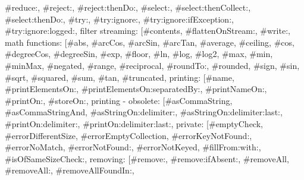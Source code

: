 {\textquotedbl{}\#reduce:\textquotedbl{}, \textquotedbl{}\#reject:\textquotedbl{}, \textquotedbl{}\#reject:thenDo:\textquotedbl{}, \textquotedbl{}\#select:\textquotedbl{}, \textquotedbl{}\#select:thenCollect:\textquotedbl{}, \textquotedbl{}\#select:thenDo:\textquotedbl{}, \textquotedbl{}\#try:\textquotedbl{}, \textquotedbl{}\#try:ignore:\textquotedbl{}, \textquotedbl{}\#try:ignore:ifException:\textquotedbl{}, \textquotedbl{}\#try:ignore:logged:\textquotedbl{}{]}, \textquotedbl{}filter streaming\textquotedbl{}: {[}\textquotedbl{}\#contents\textquotedbl{}, \textquotedbl{}\#flattenOnStream:\textquotedbl{}, \textquotedbl{}\#write:\textquotedbl{}{]}, \textquotedbl{}math functions\textquotedbl{}: {[}\textquotedbl{}\#abs\textquotedbl{}, \textquotedbl{}\#arcCos\textquotedbl{}, \textquotedbl{}\#arcSin\textquotedbl{}, \textquotedbl{}\#arcTan\textquotedbl{}, \textquotedbl{}\#average\textquotedbl{}, \textquotedbl{}\#ceiling\textquotedbl{}, \textquotedbl{}\#cos\textquotedbl{}, \textquotedbl{}\#degreeCos\textquotedbl{}, \textquotedbl{}\#degreeSin\textquotedbl{}, \textquotedbl{}\#exp\textquotedbl{}, \textquotedbl{}\#floor\textquotedbl{}, \textquotedbl{}\#ln\textquotedbl{}, \textquotedbl{}\#log\textquotedbl{}, \textquotedbl{}\#log2\textquotedbl{}, \textquotedbl{}\#max\textquotedbl{}, \textquotedbl{}\#min\textquotedbl{}, \textquotedbl{}\#minMax\textquotedbl{}, \textquotedbl{}\#negated\textquotedbl{}, \textquotedbl{}\#range\textquotedbl{}, \textquotedbl{}\#reciprocal\textquotedbl{}, \textquotedbl{}\#roundTo:\textquotedbl{}, \textquotedbl{}\#rounded\textquotedbl{}, \textquotedbl{}\#sign\textquotedbl{}, \textquotedbl{}\#sin\textquotedbl{}, \textquotedbl{}\#sqrt\textquotedbl{}, \textquotedbl{}\#squared\textquotedbl{}, \textquotedbl{}\#sum\textquotedbl{}, \textquotedbl{}\#tan\textquotedbl{}, \textquotedbl{}\#truncated\textquotedbl{}{]}, \textquotedbl{}printing\textquotedbl{}: {[}\textquotedbl{}\#name\textquotedbl{}, \textquotedbl{}\#printElementsOn:\textquotedbl{}, \textquotedbl{}\#printElementsOn:separatedBy:\textquotedbl{}, \textquotedbl{}\#printNameOn:\textquotedbl{}, \textquotedbl{}\#printOn:\textquotedbl{}, \textquotedbl{}\#storeOn:\textquotedbl{}{]}, \textquotedbl{}printing - obsolete\textquotedbl{}: {[}\textquotedbl{}\#asCommaString\textquotedbl{}, \textquotedbl{}\#asCommaStringAnd\textquotedbl{}, \textquotedbl{}\#asStringOn:delimiter:\textquotedbl{}, \textquotedbl{}\#asStringOn:delimiter:last:\textquotedbl{}, \textquotedbl{}\#printOn:delimiter:\textquotedbl{}, \textquotedbl{}\#printOn:delimiter:last:\textquotedbl{}{]}, \textquotedbl{}private\textquotedbl{}: {[}\textquotedbl{}\#emptyCheck\textquotedbl{}, \textquotedbl{}\#errorDifferentSize\textquotedbl{}, \textquotedbl{}\#errorEmptyCollection\textquotedbl{}, \textquotedbl{}\#errorKeyNotFound:\textquotedbl{}, \textquotedbl{}\#errorNoMatch\textquotedbl{}, \textquotedbl{}\#errorNotFound:\textquotedbl{}, \textquotedbl{}\#errorNotKeyed\textquotedbl{}, \textquotedbl{}\#fillFrom:with:\textquotedbl{}, \textquotedbl{}\#isOfSameSizeCheck:\textquotedbl{}{]}, \textquotedbl{}removing\textquotedbl{}: {[}\textquotedbl{}\#remove:\textquotedbl{}, \textquotedbl{}\#remove:ifAbsent:\textquotedbl{}, \textquotedbl{}\#removeAll\textquotedbl{}, \textquotedbl{}\#removeAll:\textquotedbl{}, \textquotedbl{}\#removeAllFoundIn:\textquotedbl{}, }
